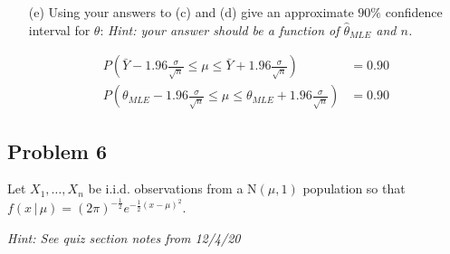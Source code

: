 \documentclass{article}
\newcommand{\1}{\mathbf{1}}
\begin{document}
\begin{itemize}
    \item[(e)]  Using your answers to (c) and (d) give an approximate $90\%$ confidence interval for $\theta$: {\it Hint: your answer should be a function of $\hat{\theta}_{MLE}$ and $n$.}
    
    \begin{align*}
        P\left(\bar Y - 1.96\frac{\sigma}{\sqrt n} \leq \mu \leq \bar Y + 1.96\frac{\sigma}{\sqrt n}\right) &= 0.90 \\
        P\left(\theta_{MLE}- 1.96\frac{\sigma}{\sqrt n} \leq \mu \leq \theta_{MLE} + 1.96\frac{\sigma}{\sqrt n}\right) &= 0.90
    \end{align*} 
\end{itemize}


\newpage
\subsection*{Problem 6}
Let $X_1, \ldots ,X_n$ be i.i.d. observations from a N$(\mu,1)$ population so that $f(x \,|\, \mu ) = (2\pi)^{-\frac{1}{2}}e^{-\frac{1}{2}(x-\mu)^2}$.\par
 {\it Hint: See quiz section notes from 12/4/20}
 
\end{document}
